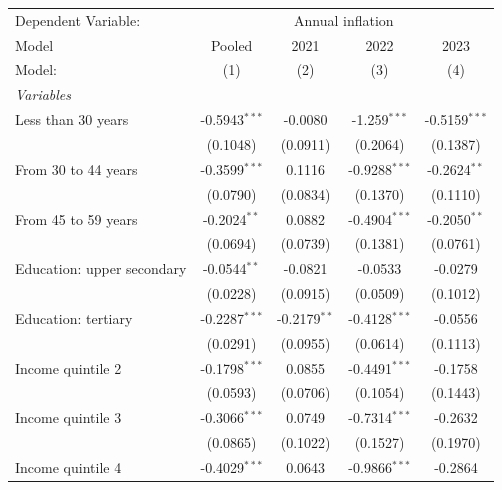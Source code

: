 
\begingroup
\centering
\begin{tabular}{lcccc}
   \tabularnewline \midrule \midrule
   Dependent Variable: & \multicolumn{4}{c}{Annual inflation}\\
   Model                      & Pooled          & 2021            & 2022            & 2023 \\   
   Model:                     & (1)             & (2)             & (3)             & (4)\\  
   \midrule
   \emph{Variables}\\
   Less than 30 years         & -0.5943$^{***}$ & -0.0080         & -1.259$^{***}$  & -0.5159$^{***}$\\   
                              & (0.1048)        & (0.0911)        & (0.2064)        & (0.1387)\\   
   From 30 to 44 years        & -0.3599$^{***}$ & 0.1116          & -0.9288$^{***}$ & -0.2624$^{**}$\\   
                              & (0.0790)        & (0.0834)        & (0.1370)        & (0.1110)\\   
   From 45 to 59 years        & -0.2024$^{**}$  & 0.0882          & -0.4904$^{***}$ & -0.2050$^{**}$\\   
                              & (0.0694)        & (0.0739)        & (0.1381)        & (0.0761)\\   
   Education: upper secondary & -0.0544$^{**}$  & -0.0821         & -0.0533         & -0.0279\\   
                              & (0.0228)        & (0.0915)        & (0.0509)        & (0.1012)\\   
   Education: tertiary        & -0.2287$^{***}$ & -0.2179$^{**}$  & -0.4128$^{***}$ & -0.0556\\   
                              & (0.0291)        & (0.0955)        & (0.0614)        & (0.1113)\\   
   Income quintile 2          & -0.1798$^{***}$ & 0.0855          & -0.4491$^{***}$ & -0.1758\\   
                              & (0.0593)        & (0.0706)        & (0.1054)        & (0.1443)\\   
   Income quintile 3          & -0.3066$^{***}$ & 0.0749          & -0.7314$^{***}$ & -0.2632\\   
                              & (0.0865)        & (0.1022)        & (0.1527)        & (0.1970)\\   
   Income quintile 4          & -0.4029$^{***}$ & 0.0643          & -0.9866$^{***}$ & -0.2864\\   

\end{tabular}
